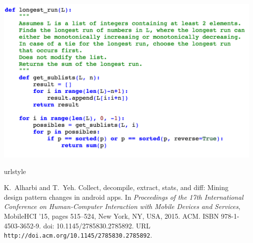\documentclass[12pt,twoside]{mitthesis}
\providecommand{\DIFaddbegin}{} %
\providecommand{\DIFaddend}{} %
\providecommand{\DIFdelbegin}{} %
\providecommand{\DIFdelend}{} %
\begin{document}
{{{{{{{{{{\begin{itemize}
\DIFdelbegin %



\DIFdelend \DIFaddbegin \includegraphics[scale=0.65]{Body/figures/grovercode/fig_longest_run}
 \end{itemize} 
\DIFaddend %
%
%


\clearpage
\DIFdelbegin %
\DIFdelend \DIFaddbegin \begin{thebibliography}{135}
\DIFaddend \providecommand{\natexlab}[1]{#1}
\providecommand{\url}[1]{\texttt{#1}}
\expandafter\ifx\csname urlstyle\endcsname\relax
  \providecommand{\doi}[1]{doi: #1}\else
  \providecommand{\doi}{doi: \begingroup \urlstyle{rm}\Url}\fi

K.~Alharbi and T.~Yeh.
\newblock Collect, decompile, extract, stats, and diff: Mining design pattern
  changes in android apps.
\newblock In \emph{Proceedings of the 17th International Conference on
  Human-Computer Interaction with Mobile Devices and Services}, MobileHCI '15,
  pages 515--524, New York, NY, USA, 2015. ACM.
\newblock ISBN 978-1-4503-3652-9.
\newblock \doi{10.1145/2785830.2785892}.
\newblock URL \url{http://doi.acm.org/10.1145/2785830.2785892}.


\end{thebibliography}}}}}}}}}}}
\end{document}
